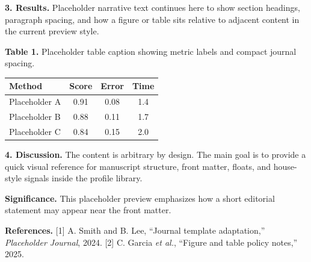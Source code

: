 \documentclass[10pt,a4paper]{article}
\begin{document}
\textbf{3. Results.} Placeholder narrative text continues here to show section headings, paragraph spacing, and how a figure or table sits relative to adjacent content in the current preview style.

\noindent\textbf{Table 1.} Placeholder table caption showing metric labels and compact journal spacing.\par\begin{center}
\begin{tabular}{lccc}
\toprule
Method & Score & Error & Time\\
\midrule
Placeholder A & 0.91 & 0.08 & 1.4\\
Placeholder B & 0.88 & 0.11 & 1.7\\
Placeholder C & 0.84 & 0.15 & 2.0\\
\bottomrule
\end{tabular}\end{center}\vspace{0.5em}

\textbf{4. Discussion.} The content is arbitrary by design. The main goal is to provide a quick visual reference for manuscript structure, front matter, floats, and house-style signals inside the profile library.


\noindent \textbf{Significance.} This placeholder preview emphasizes how a short editorial statement may appear near the front matter.\par
\vspace{0.5em}
\noindent \textbf{References.} [1] A. Smith and B. Lee, ``Journal template adaptation,'' \textit{Placeholder Journal}, 2024. [2] C. Garcia \textit{et al.}, ``Figure and table policy notes,'' 2025.\par
\vspace{0.6em}
\end{document}
